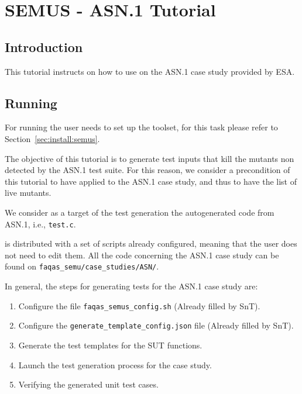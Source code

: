
\chapter{SEMUS - ASN.1 Tutorial}
\label{chapter:semus:tutorial}

\section{Introduction}

This tutorial instructs on how to use \SEMUS on the ASN.1 case study provided by ESA.

\section{Running \SEMUS}
\label{sec:semus_running}

For running \SEMUS the user needs to set up the toolset, for this task please refer to Section~\ref{sec:install:semus}.

The objective of this tutorial is to generate test inputs that kill the mutants non detected by the ASN.1 test suite. For this reason, we consider a precondition of this tutorial to have applied \MASS to the ASN.1 case study, and thus to have the list of live mutants.

We consider as a target of the test generation the autogenerated code from ASN.1, i.e., \texttt{test.c}.

\SEMUS is distributed with a set of scripts already configured, meaning that the user does not need to edit them. All the code concerning the ASN.1 case study can be found on \texttt{faqas\_semu/case\_studies/ASN/}. 

In general, the steps for generating tests for the ASN.1 case study are:

\begin{enumerate}
    \item Configure the file \texttt{faqas\_semus\_config.sh} (Already filled by SnT).
    \item Configure the \texttt{generate\_template\_config.json} file (Already filled by SnT).
    \item Generate the test templates for the SUT functions.
    \item Launch the test generation process for the case study.
    \item Verifying the generated unit test cases.
\end{enumerate}


